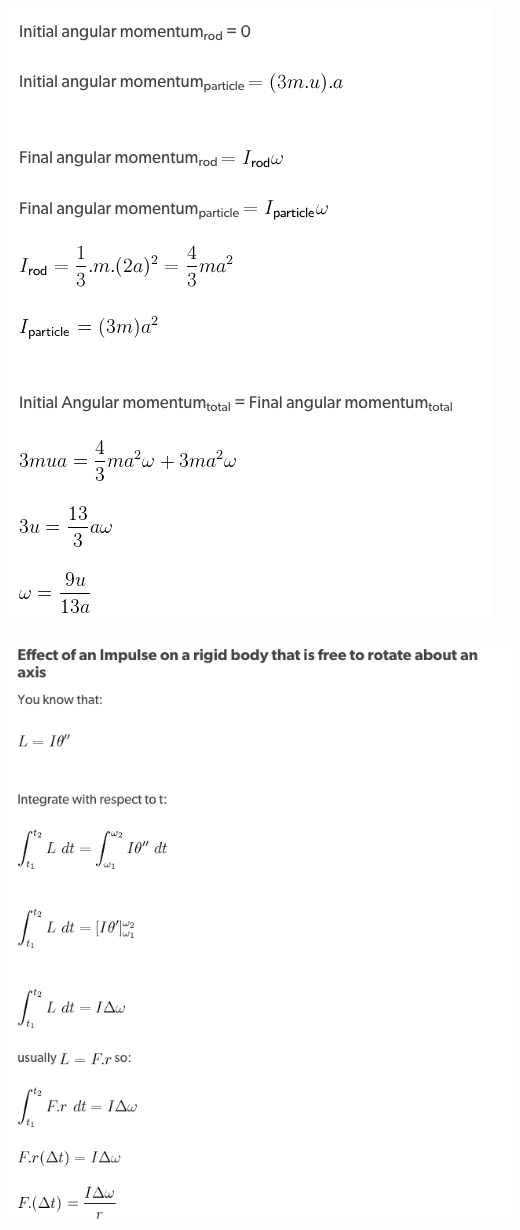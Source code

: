 \documentclass[a4paper]{article}
\begin{document}
\begin{center}
    \includegraphics[scale=0.5]{img_M/24_eg3}
\end{center}
\begin{center}
    \includegraphics[scale=0.5]{img_M/24_eg4}
\end{center}
\end{document}

